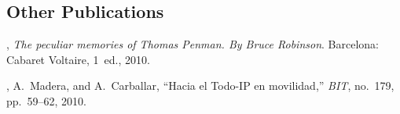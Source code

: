 \subsection{Other Publications}

\begin{thebibliography}{2}

, {\em {The peculiar memories of Thomas Penman.
  By Bruce Robinson}}.
\newblock Barcelona: Cabaret Voltaire, 1~ed., 2010.

, A.~Madera, and A.~Carballar, ``{Hacia el Todo-IP en
  movilidad},'' {\em BIT}, no.~179, pp.~59--62, 2010.

\end{thebibliography}
